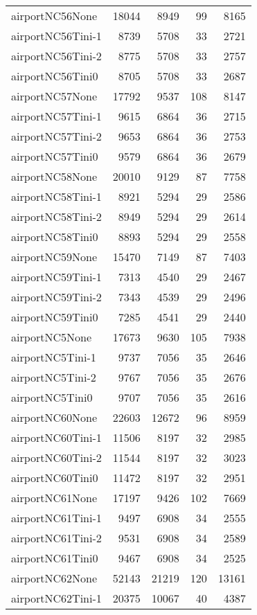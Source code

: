 \begin{longtable}{lrrrr}
airportNC56None & 18044 & 8949 & 99 & 8165 \\
airportNC56Tini-1 & 8739 & 5708 & 33 & 2721 \\
airportNC56Tini-2 & 8775 & 5708 & 33 & 2757 \\
airportNC56Tini0 & 8705 & 5708 & 33 & 2687 \\
airportNC57None & 17792 & 9537 & 108 & 8147 \\
airportNC57Tini-1 & 9615 & 6864 & 36 & 2715 \\
airportNC57Tini-2 & 9653 & 6864 & 36 & 2753 \\
airportNC57Tini0 & 9579 & 6864 & 36 & 2679 \\
airportNC58None & 20010 & 9129 & 87 & 7758 \\
airportNC58Tini-1 & 8921 & 5294 & 29 & 2586 \\
airportNC58Tini-2 & 8949 & 5294 & 29 & 2614 \\
airportNC58Tini0 & 8893 & 5294 & 29 & 2558 \\
airportNC59None & 15470 & 7149 & 87 & 7403 \\
airportNC59Tini-1 & 7313 & 4540 & 29 & 2467 \\
airportNC59Tini-2 & 7343 & 4539 & 29 & 2496 \\
airportNC59Tini0 & 7285 & 4541 & 29 & 2440 \\
airportNC5None & 17673 & 9630 & 105 & 7938 \\
airportNC5Tini-1 & 9737 & 7056 & 35 & 2646 \\
airportNC5Tini-2 & 9767 & 7056 & 35 & 2676 \\
airportNC5Tini0 & 9707 & 7056 & 35 & 2616 \\
airportNC60None & 22603 & 12672 & 96 & 8959 \\
airportNC60Tini-1 & 11506 & 8197 & 32 & 2985 \\
airportNC60Tini-2 & 11544 & 8197 & 32 & 3023 \\
airportNC60Tini0 & 11472 & 8197 & 32 & 2951 \\
airportNC61None & 17197 & 9426 & 102 & 7669 \\
airportNC61Tini-1 & 9497 & 6908 & 34 & 2555 \\
airportNC61Tini-2 & 9531 & 6908 & 34 & 2589 \\
airportNC61Tini0 & 9467 & 6908 & 34 & 2525 \\
airportNC62None & 52143 & 21219 & 120 & 13161 \\
airportNC62Tini-1 & 20375 & 10067 & 40 & 4387 \\

\end{longtable}
